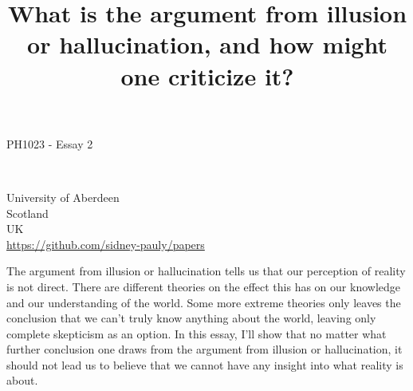 \documentclass[fleqn,14pt]{article}
\begin{document}
\lstset{
  language=Python,
  basicstyle=\small,          %
  keywordstyle=\bfseries,
  identifierstyle=,           %
  commentstyle=,              %
  stringstyle=\ttfamily,      %
  showstringspaces=false,     %
  numbers=left,
  numberstyle=\tiny,
  numbersep=5pt,
  frame=tb,
}

\title{What is the argument from illusion or hallucination, and how might one criticize it?}
\date{}




\fancyhf{}



\begin{titlepage}
  \begin{center}
    \Large
    \textbf{\thetitle}
        
    \vspace{0.4cm}
    \large
    PH1023 - Essay 2
        
    \vspace{0.4cm}
    \textbf{\theauthor}\\
    \textbf{\theuoastudentid}

       
    \vfill


    University of Aberdeen\\
    Scotland\\
    UK\\
    \thedate
    \vspace{0.4cm}
    \url{https://github.com/sidney-pauly/papers}
  \end{center}
\end{titlepage}



The argument from illusion or hallucination tells us that our perception of reality is not direct. There are
different theories on the effect this has on our knowledge and our understanding of the world. Some more extreme theories
only leaves the conclusion that we can't truly know anything about the world, leaving only complete
skepticism as an option. In this essay, I'll show that no matter what further conclusion one draws from the
argument from illusion or hallucination, it should not lead us to believe that we cannot have any insight
into what reality is about.
\end{document}
